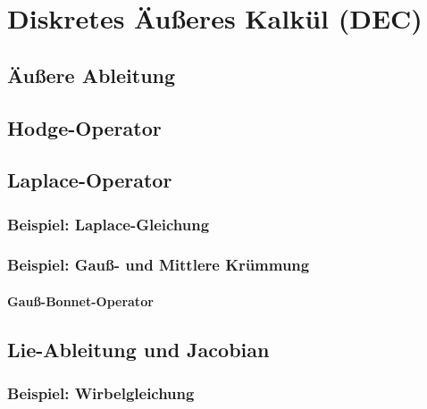 \chapter{Diskretes Äußeres Kalkül (DEC)}

\section{Äußere Ableitung}

\section{Hodge-Operator}

\section{Laplace-Operator}

  \subsection{Beispiel: Laplace-Gleichung}


  \subsection{Beispiel: Gauß- und Mittlere Krümmung}
    \subsubsection{Gauß-Bonnet-Operator}

\section{Lie-Ableitung und Jacobian}

  \subsection{Beispiel: Wirbelgleichung}



